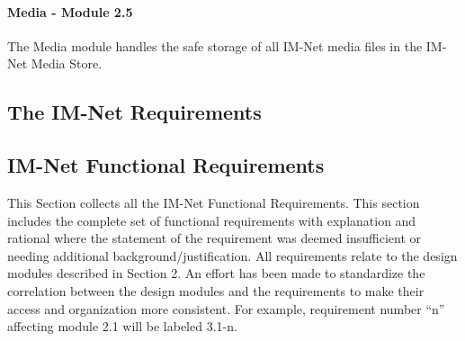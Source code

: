 \documentclass[letterpaper,12pt]{article}
\newcounter{rcounter}						%
\newcommand{\Section}[1]{\section{#1} \setcounter{figure}{0}}
\begin{document}
{\paragraph{Media - Module 2.5}
The Media module handles the safe storage of all IM-Net media files in the IM-Net Media Store.


\eject

\textcolor{section}{\Section{The IM-Net Requirements}}
 
\textcolor{subsection}{\subsection{IM-Net Functional Requirements}}

This Section collects all the IM-Net Functional Requirements. This section includes the complete set of functional requirements with explanation and rational where the statement of the requirement was deemed insufficient or needing additional background/justification. All requirements relate to the design modules described in Section 2. An effort has been made to standardize the correlation between the design modules and the requirements to make their access and organization more consistent. For example, requirement number ``n'' affecting module 2.1 will be labeled 3.1-n.

\setcounter{rcounter}{0}

}
\end{document}
